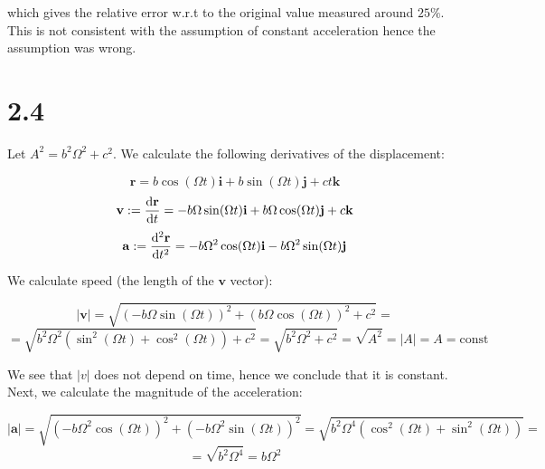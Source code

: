 \documentclass{article}
\begin{document}
which gives the relative error w.r.t to the original value measured around \(25 \% \). This is not
consistent with the assumption of constant acceleration hence the assumption was wrong.

\section*{2.4}
Let \(A^2 = b^{2}\Omega^{2} + c^2\). We calculate the following derivatives of the displacement:

\begin{equation*}
    \mathbf{r} = b \cos(\Omega t) \mathbf{i} +  b \sin(\Omega t) \mathbf{j} +  ct \mathbf{k}
\end{equation*}
\begin{equation*}
    \mathbf{v} := \dv{\mathbf{r}}{t} = - b \Omega \sin(\Omega t) \mathbf{i} + b \Omega \cos(\Omega t) \mathbf{j} + c \mathbf{k}
\end{equation*}
\begin{equation*}
    \mathbf{a} := \dv[2]{\mathbf{r}}{t} = - b \Omega^{2} \cos(\Omega t) \mathbf{i} - b \Omega^{2} \sin(\Omega t) \mathbf{j}
\end{equation*}

We calculate speed (the length of the \(\mathbf{v}\) vector):

\begin{equation*}
    |\mathbf{v}| = \sqrt{(- b \Omega \sin(\Omega t))^{2} + (b \Omega \cos(\Omega t))^{2} + c^2} = 
\end{equation*}
\begin{equation*}
    = \sqrt{b^{2}\Omega^{2}(\sin^{2}(\Omega t) + \cos^{2}(\Omega t)) + c^2} = \sqrt{b^{2}\Omega^{2} + c^2} = \sqrt{A^2} = |A| = A = \mbox{const}
\end{equation*}

We see that \(|v|\) does not depend on time, hence we conclude that it is constant. Next, we calculate the magnitude of the acceleration:

\begin{equation*}
    |\mathbf{a}| = \sqrt{(- b \Omega^{2} \cos(\Omega t))^{2} + (- b \Omega^{2} \sin(\Omega t))^{2}} = \sqrt{b^{2}\Omega^{4}(\cos^{2}(\Omega t) + \sin^{2}(\Omega t))} =
\end{equation*}
\begin{equation*}
    = \sqrt{b^{2}\Omega^{4}} = b \Omega^{2}
\end{equation*}
\end{document}
